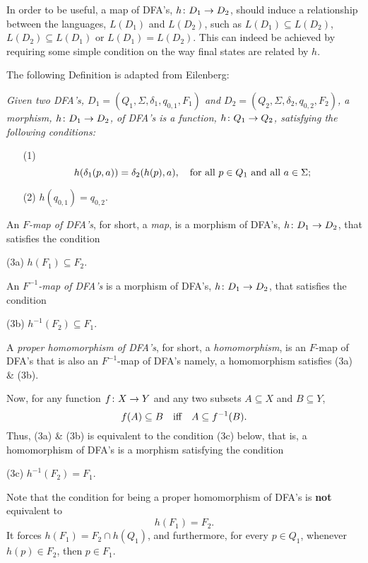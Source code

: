 \medskip
In order to be useful, a map of DFA's, $h\colon D_1\rightarrow D_2$,
should induce a relationship between the languages, $L(D_1)$
and $L(D_2)$, such as $L(D_1) \subseteq L(D_2)$,
$L(D_2) \subseteq L(D_1)$ or $L(D_1) = L(D_2)$.
This can indeed be achieved by requiring some simple
condition on the way final states are related by $h$.

\medskip
The following Definition is adapted from Eilenberg:

\begin{defin}
\label{DFAmapdef}
{\em 
Given two DFA's,
$D_1 = (Q_1, \Sigma, \delta_1, q_{0, 1}, F_1)$
and 
$D_2 = (Q_2, \Sigma, \delta_2, q_{0, 2}, F_2)$,
a {\it  morphism, $h\colon D_1\rightarrow D_2$, of DFA's\/} is a function,
$h\colon Q_1\rightarrow Q_2$, satisfying the following conditions:
\begin{enumerate}
\item[(1)]
\[
h(\delta_1(p, a)) = \delta_2(h(p), a),
\quad
\hbox{for all $p\in Q_1$ and all $a\in \Sigma$};
\]
\item[(2)]
$h(q_{0, 1}) = q_{0, 2}$.
\end{enumerate}

\medskip
An {\it  $F$-map  of DFA's\/}, for short,
a {\it  map\/},  is a morphism of DFA's, 
$h\colon D_1\rightarrow D_2$,
that satisfies the condition

\medskip
(3a)
$h(F_1) \subseteq F_2$.

\medskip
An {\it  $F^{-1}$-map of DFA's\/} is a 
morphism of DFA's, 
$h\colon D_1\rightarrow D_2$, 
that satisfies the condition

\medskip
(3b)
$h^{-1}(F_2) \subseteq F_1$.

\medskip
A {\it  proper homomorphism of DFA's\/}, for short, a 
{\it  homomorphism\/}, is an $F$-map
of DFA's that is also an $F^{-1}$-map of DFA's namely,
a  homomorphism satisfies  (3a) \& (3b).

\medskip
Now, for any function $f\colon X\rightarrow Y$ and any two subsets
$A\subseteq X$ and $B\subseteq Y$,
\[
f(A) \subseteq B\quad\hbox{iff}\quad A\subseteq f^{-1}(B).
\]
Thus, (3a) \& (3b) is equivalent
to the condition (3c) below, that is, a homomorphism of DFA's
is a morphism satisfying the condition

\medskip
(3c)
$h^{-1}(F_2) = F_1$.
}
\end{defin}


\medskip
Note that the condition for being a proper homomorphism of DFA's
is {\bf not} equivalent to
\[
h(F_1) = F_2.
\]
It forces $h(F_1) = F_2 \cap h(Q_1)$,
and furthermore, 
for every $p\in Q_1$, whenever
$h(p) \in F_2$, then $p\in F_1$.

